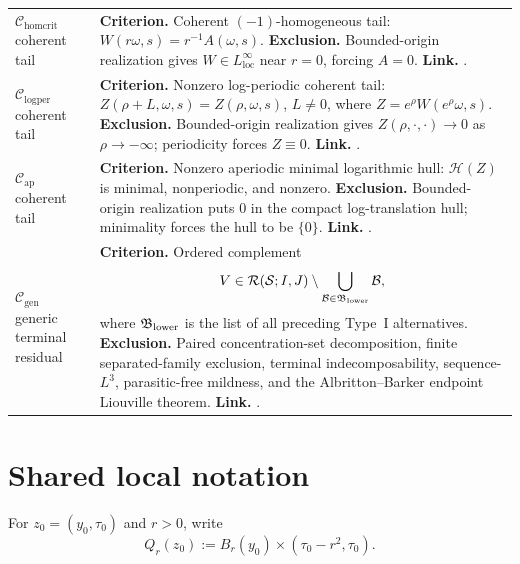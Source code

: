 \documentclass[11pt]{amsart}
\numberwithin{equation}{section}
\theoremstyle{plain}
\theoremstyle{definition}
\theoremstyle{remark}
\newcommand{\loc}{\mathrm{loc}}
\newcommand{\calS}{\mathcal S}
\newcommand{\calR}{\mathcal R}
\newcommand{\Cgen}{\mathcal C_{\mathrm{gen}}}
\newcommand{\Chomcrit}{\mathcal C_{\mathrm{homcrit}}}
\newcommand{\Clogper}{\mathcal C_{\mathrm{logper}}}
\newcommand{\Capcrit}{\mathcal C_{\mathrm{ap}}}
\begin{document}
\begin{longtable}{@{}L{1.20in}L{4.65in}@{}}
\(\Chomcrit\) coherent tail &
\textbf{Criterion.}  Coherent \((-1)\)-homogeneous tail:
\(W(r\omega,s)=r^{-1}A(\omega,s)\).
\textbf{Exclusion.}  Bounded-origin realization gives
\(W\in L^\infty_{\loc}\) near \(r=0\), forcing \(A=0\).
\textbf{Link.}  .\\

\(\Clogper\) coherent tail &
\textbf{Criterion.}  Nonzero log-periodic coherent tail:
\(Z(\rho+L,\omega,s)=Z(\rho,\omega,s)\), \(L\ne0\), where
\(Z=e^\rho W(e^\rho\omega,s)\).
\textbf{Exclusion.}  Bounded-origin realization gives
\(Z(\rho,\cdot,\cdot)\to0\) as \(\rho\to-\infty\); periodicity forces
\(Z\equiv0\).
\textbf{Link.}  .\\

\(\Capcrit\) coherent tail &
\textbf{Criterion.}  Nonzero aperiodic minimal logarithmic hull:
\(\mathcal H(Z)\) is minimal, nonperiodic, and nonzero.
\textbf{Exclusion.}  Bounded-origin realization puts \(0\) in the compact
log-translation hull; minimality forces the hull to be \(\{0\}\).
\textbf{Link.}  .\\

\(\Cgen\) generic terminal residual &
\textbf{Criterion.}  Ordered complement
\[
   V\in\calR(\calS;I,J)
   \setminus\bigcup_{\mathcal B\in\mathfrak B_{\rm lower}}\mathcal B ,
\]
where \(\mathfrak B_{\rm lower}\) is the list of all preceding Type~I
alternatives.
\textbf{Exclusion.}  Paired concentration-set decomposition, finite
separated-family exclusion, terminal indecomposability, sequence-\(L^3\),
parasitic-free mildness, and the Albritton--Barker endpoint Liouville theorem.
\textbf{Link.}  .\\
\end{longtable}
\endgroup

\section{Shared local notation}
\label{sec:shared-notation}

For \(z_0=(y_0,\tau_0)\) and \(r>0\), write
\[
   Q_r(z_0):=B_r(y_0)\times(\tau_0-r^2,\tau_0).
\]
\end{document}

